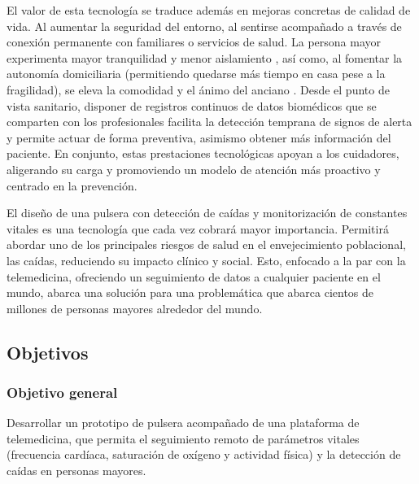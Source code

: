 \documentclass[12pt, a4paper]{article}
\begin{document}
    El valor de esta tecnología se traduce además en mejoras concretas de calidad de vida. Al aumentar la seguridad del entorno, al sentirse acompañado a través de conexión permanente con familiares o servicios de salud. La persona mayor experimenta mayor tranquilidad y menor aislamiento \cite{Reina2024}, así como, al fomentar la autonomía domiciliaria (permitiendo quedarse más tiempo en casa pese a la fragilidad), se eleva la comodidad y el ánimo del anciano \cite{Reina2024}. Desde el punto de vista sanitario, disponer de registros continuos de datos biomédicos que se comparten con los profesionales facilita la detección temprana de signos de alerta y permite actuar de forma preventiva, asimismo obtener más información del paciente. En conjunto, estas prestaciones tecnológicas apoyan a los cuidadores, aligerando su carga y promoviendo un modelo de atención más proactivo y centrado en la prevención.
    
    El diseño de una pulsera con detección de caídas y monitorización de constantes vitales es una tecnología que cada vez cobrará mayor importancia. Permitirá abordar uno de los principales riesgos de salud en el envejecimiento poblacional, las caídas, reduciendo su impacto clínico y social. Esto, enfocado a la par con la telemedicina, ofreciendo un seguimiento de datos a cualquier paciente en el mundo, abarca una solución para una problemática que abarca cientos de millones de personas mayores alrededor del mundo.

	\subsection{Objetivos}
	
	\subsubsection{Objetivo general}
	Desarrollar un prototipo de pulsera acompañado de una plataforma de telemedicina, que permita el seguimiento remoto de parámetros vitales (frecuencia cardíaca, saturación de oxígeno y actividad física) y la detección de caídas en personas mayores.
	
\end{document}
